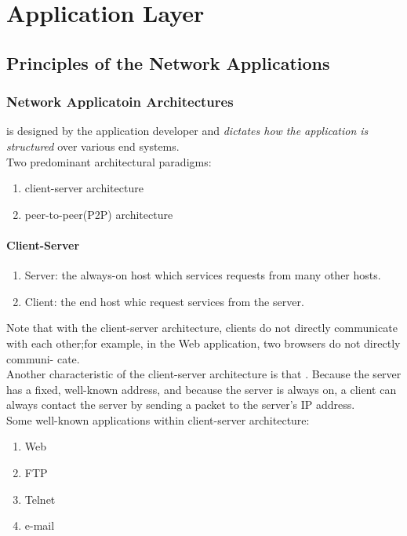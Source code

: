 \chapter{Application Layer}




\section{Principles of the Network Applications}

\subsection{Network Applicatoin Architectures}

 is designed by the application developer and \textit{dictates how the application is structured} over
various end systems.\\

Two predominant architectural paradigms:
\begin{enumerate}
    \item client-server architecture
    \item peer-to-peer(P2P) architecture
\end{enumerate}

\subsubsection{Client-Server}
\begin{enumerate}
    \item Server: the always-on host which services requests from many other hosts.
    \item Client: the end host whic request services from the server.
\end{enumerate}

Note that with the client-server architecture, clients do not directly communicate with each
other;for example, in the Web application, two browsers do not directly communi-
cate.\\
Another characteristic of the client-server architecture is that . Because
the server has a fixed, well-known address, and because the server is always on, a
client can always contact the server by sending a packet to the server’s IP address.\\
Some well-known applications within client-server architecture:
\begin{enumerate}
    \item Web
    \item FTP
    \item Telnet
    \item e-mail
\end{enumerate}




